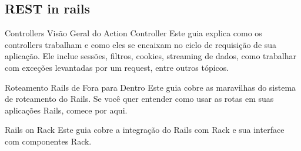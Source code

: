 \documentclass[serif,mathserif]{article}
\begin{document}
\subsection{REST in rails}



Controllers
Visão Geral do Action Controller
Este guia explica como os controllers trabalham e como eles se encaixam no ciclo de requisição de sua aplicação. Ele inclue sessões, filtros, cookies, streaming de dados, como trabalhar com exceções levantadas por um request, entre outros tópicos.

Roteamento Rails de Fora para Dentro
Este guia cobre as maravilhas do sistema de roteamento do Rails. Se você quer entender como usar as rotas em suas aplicações Rails, comece por aqui.

Rails on Rack
Este guia cobre a integração do Rails com Rack e sua interface com componentes Rack.
\end{document}
